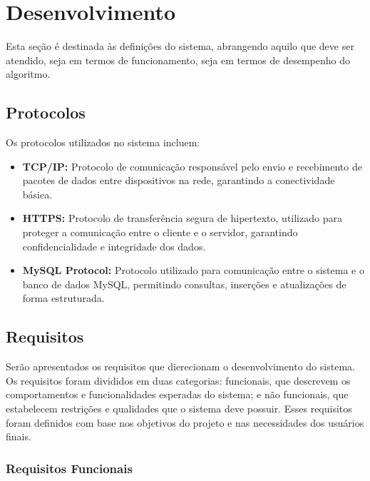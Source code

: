 \documentclass[
	article,			%
	12pt,				%
	oneside,			%
	a4paper,			%
	english,			%
	brazil,				%
	sumario=tradicional
	]{abntex2}
\begin{document}
\section{Desenvolvimento}

Esta seção é destinada às definições do sistema, abrangendo aquilo que deve ser atendido, seja em termos de funcionamento, seja em termos de desempenho do algoritmo.

\subsection{Protocolos}

Os protocolos utilizados no sistema incluem:

\begin{itemize}
    \item \textbf{TCP/IP:} Protocolo de comunicação responsável pelo envio e recebimento de pacotes de dados entre dispositivos na rede, garantindo a conectividade básica.
    \item \textbf{HTTPS:} Protocolo de transferência segura de hipertexto, utilizado para proteger a comunicação entre o cliente e o servidor, garantindo confidencialidade e integridade dos dados.
    \item \textbf{MySQL Protocol:} Protocolo utilizado para comunicação entre o sistema e o banco de dados MySQL, permitindo consultas, inserções e atualizações de forma estruturada.
\end{itemize}



\subsection{Requisitos}
Serão apresentados os requisitos que dierecionam o desenvolvimento do sistema. Os requisitos foram divididos em duas categorias: funcionais, que descrevem os comportamentos e funcionalidades esperadas do sistema; e não funcionais, que estabelecem restrições e qualidades que o sistema deve possuir. Esses requisitos foram definidos com base nos objetivos do projeto e nas necessidades dos usuários finais.


\subsubsection{Requisitos Funcionais}
\end{document}
